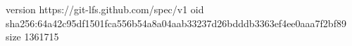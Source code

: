 version https://git-lfs.github.com/spec/v1
oid sha256:64a42c95df1501fca556b54a8a04aab33237d26bdddb3363ef4ee0aaa7f2bf89
size 1361715
